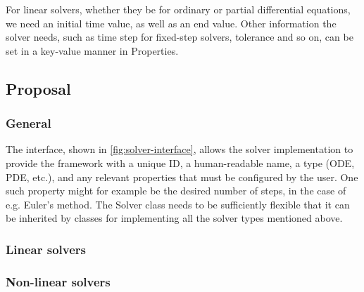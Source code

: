 \documentclass[\rootfolder/main.tex]{subfiles}
\begin{document}
For linear solvers, whether they be for ordinary or partial differential equations, we need an initial time value, as well as an end value.
Other information the solver needs, such as time step for fixed-step solvers, tolerance and so on, can be set in a key-value manner in Properties.

\subsection{Proposal}


\subsubsection{General}

The interface, shown in \cref{fig:solver-interface}, allows the solver implementation to provide the framework with a unique ID, a human-readable name, a
type (ODE, PDE, etc.\@), and any relevant properties that must be configured by the user.
One such property might for example be the desired number of steps, in the case of e.g. Euler's method.
The Solver class needs to be sufficiently flexible that it can be inherited by classes for implementing all the solver types mentioned above.

\subsubsection{Linear solvers}



\subsubsection{Non-linear solvers}
\end{document}
